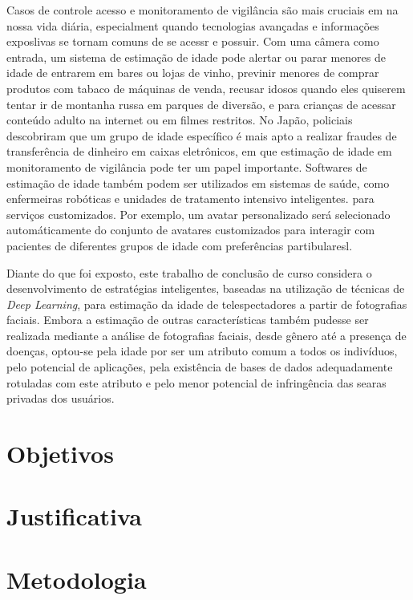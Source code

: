 Casos de controle acesso e monitoramento de vigilância são mais cruciais em na nossa vida diária, especialment quando tecnologias avançadas e informações exposlivas se tornam comuns de se acessr e possuir. Com uma câmera como entrada, um sistema de estimação de idade pode alertar ou parar menores de idade de entrarem em bares ou lojas de vinho, previnir menores de comprar produtos com tabaco de máquinas de venda, recusar idosos quando eles quiserem tentar ir de montanha russa em parques de diversão, e para crianças de acessar conteúdo adulto na internet ou em filmes restritos. No Japão, policiais descobriram que um grupo de idade específico é mais apto a realizar fraudes de transferência de dinheiro em caixas eletrônicos, em que estimação de idade em monitoramento de vigilância pode ter um papel importante. Softwares de estimação de idade também podem ser utilizados em sistemas de saúde, como enfermeiras robóticas e unidades de tratamento intensivo inteligentes. para serviços customizados. Por exemplo, um avatar personalizado será selecionado automáticamente do conjunto de avatares customizados para interagir com pacientes de diferentes grupos de idade com preferências partibularesl.

Diante do que foi exposto, este trabalho de conclusão de curso considera o desenvolvimento de estratégias inteligentes, baseadas na utilização de técnicas de \emph{Deep Learning}, para estimação da idade de telespectadores a partir de fotografias faciais. Embora a estimação de outras características também pudesse ser realizada mediante a análise de fotografias faciais, desde gênero até a presença de doenças, optou-se pela idade por ser um atributo comum a todos os indivíduos, pelo potencial de aplicações, pela existência de bases de dados adequadamente rotuladas com este atributo e pelo menor potencial de infringência das searas privadas dos usuários.

\section{Objetivos}\label{sec:objetivo}


\section{Justificativa}\label{sec:just}


\section{Metodologia}\label{sec:metodo}


